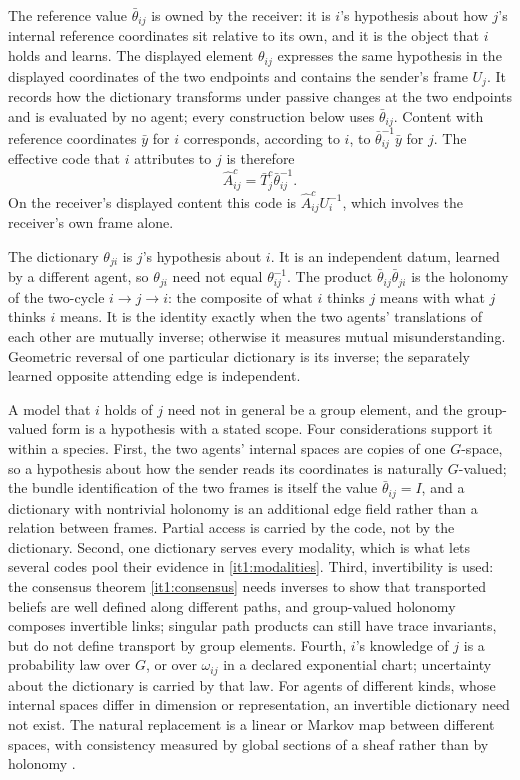 The reference value $\bar\theta_{ij}$ is owned by the receiver: it is $i$'s hypothesis about how $j$'s internal reference coordinates sit relative to its own, and it is the object that $i$ holds and learns. The displayed element $\theta_{ij}$ expresses the same hypothesis in the displayed coordinates of the two endpoints and contains the sender's frame $U_j$. It records how the dictionary transforms under passive changes at the two endpoints and is evaluated by no agent; every construction below uses $\bar\theta_{ij}$. Content with reference coordinates $\bar y$ for $i$ corresponds, according to $i$, to $\bar\theta_{ij}^{-1}\bar y$ for $j$. The effective code that $i$ attributes to $j$ is therefore
\begin{equation}
\hat A_{ij}^c=\bar T_j^c\bar\theta_{ij}^{-1}.
\label{it1:effective-code}
\end{equation}
On the receiver's displayed content this code is $\hat A_{ij}^cU_i^{-1}$, which involves the receiver's own frame alone.

The dictionary $\theta_{ji}$ is $j$'s hypothesis about $i$. It is an independent datum, learned by a different agent, so $\theta_{ji}$ need not equal $\theta_{ij}^{-1}$. The product $\bar\theta_{ij}\bar\theta_{ji}$ is the holonomy of the two-cycle $i\to j\to i$: the composite of what $i$ thinks $j$ means with what $j$ thinks $i$ means. It is the identity exactly when the two agents' translations of each other are mutually inverse; otherwise it measures mutual misunderstanding. Geometric reversal of one particular dictionary is its inverse; the separately learned opposite attending edge is independent.

A model that $i$ holds of $j$ need not in general be a group element, and the group-valued form is a hypothesis with a stated scope. Four considerations support it within a species. First, the two agents' internal spaces are copies of one $G$-space, so a hypothesis about how the sender reads its coordinates is naturally $G$-valued; the bundle identification of the two frames is itself the value $\bar\theta_{ij}=I$, and a dictionary with nontrivial holonomy is an additional edge field rather than a relation between frames. Partial access is carried by the code, not by the dictionary. Second, one dictionary serves every modality, which is what lets several codes pool their evidence in \cref{it1:modalities}. Third, invertibility is used: the consensus theorem \cref{it1:consensus} needs inverses to show that transported beliefs are well defined along different paths, and group-valued holonomy composes invertible links; singular path products can still have trace invariants, but do not define transport by group elements. Fourth, $i$'s knowledge of $j$ is a probability law over $G$, or over $\omega_{ij}$ in a declared exponential chart; uncertainty about the dictionary is carried by that law. For agents of different kinds, whose internal spaces differ in dimension or representation, an invertible dictionary need not exist. The natural replacement is a linear or Markov map between different spaces, with consistency measured by global sections of a sheaf rather than by holonomy \citep{HansenGhrist2021}.

